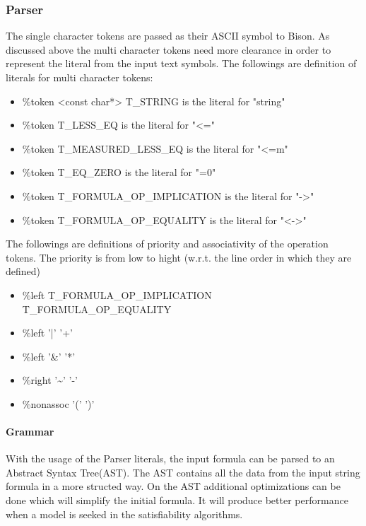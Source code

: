 \documentclass{article}
\begin{document}

	\subsubsection{Parser}
			The single character tokens are passed as their ASCII symbol to Bison. 
			As discussed above the multi character tokens need more clearance in order to represent the literal from the input text symbols.
			The followings are definition of literals for multi character tokens:
			\begin{itemize}
				\item \%token <const char*> T\_STRING is the literal for "string"
				\item \%token T\_LESS\_EQ is the literal for "<="
				\item \%token T\_MEASURED\_LESS\_EQ is the literal for "<=m"
				\item \%token T\_EQ\_ZERO is the literal for "=0"
				\item \%token T\_FORMULA\_OP\_IMPLICATION is the literal for "->"
				\item \%token T\_FORMULA\_OP\_EQUALITY is the literal for "<->"
			\end{itemize}
			The followings are definitions of priority and associativity of the operation tokens. 
			The priority is from low to hight (w.r.t. the line order in which they are defined)
			\begin{itemize}
				\item \%left T\_FORMULA\_OP\_IMPLICATION T\_FORMULA\_OP\_EQUALITY
				\item \%left '|' '+'
				\item \%left '\&' '*'
				\item \%right '\textasciitilde' '-'
				\item \%nonassoc '(' ')'
			\end{itemize}

		\paragraph{Grammar}
			With the usage of the Parser literals, the input formula can be parsed to an Abstract Syntax Tree(AST).
			The AST contains all the data from the input string formula in a more structed way.
			On the AST additional optimizations can be done which will simplify the initial formula. It will produce better performance when a model is seeked in the satisfiability algorithms.
\end{document}
